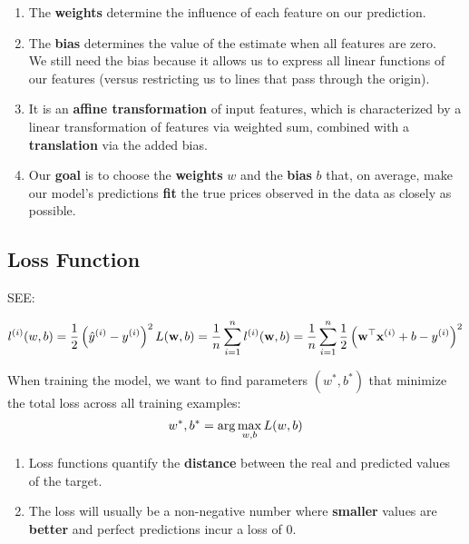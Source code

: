 \begin{enumerate}[itemsep=0.2cm]
    \item The \textbf{weights} determine the influence of each feature on our prediction. 
    
    \item The \textbf{bias} determines the value of the estimate when all features are zero.\\
    We still need the bias because it allows us to express all linear functions of our features (versus restricting us to lines that pass through the origin).

    \item It is an \textbf{affine transformation} of input features, which is characterized by a linear transformation of features via weighted sum, combined with a \textbf{translation} via the added bias. 

    \item Our \textbf{goal} is to choose the \textbf{weights} $w$ and the \textbf{bias} $b$ that, on average, make our model’s predictions \textbf{fit} the true prices observed in the data as closely as possible.

\end{enumerate}




\subsection*{Loss Function \cite{dnn-1}}
SEE: 

\[
    l^{(i)}(w,b) = \frac{1}{2}\left( \hat{y}^{(i)} - y^{(i)}\right)^2
    \hfill
    {\displaystyle L(\mathbf{w}, b) =\frac{1}{n}\sum_{i=1}^n l^{(i)}(\mathbf{w}, b) =\frac{1}{n} \sum_{i=1}^n \frac{1}{2}\left(\mathbf{w}^\top \mathbf{x}^{(i)} + b - y^{(i)}\right)^2}
\]

When training the model, we want to find parameters $(w^\ast, b^\ast)$ that minimize the total loss
across all training examples:
\[
    \displaystyle
    \hfill
        w^\ast, b^\ast = \arg\max_{w,b} L(w,b)
    \hfill
\]


\begin{enumerate}[itemsep=0.2cm]
    \item Loss functions quantify the \textbf{distance} between the real and predicted values of the target.

    \item The loss will usually be a non-negative number where \textbf{smaller} values are \textbf{better} and perfect predictions incur a loss of $0$.

\end{enumerate}





